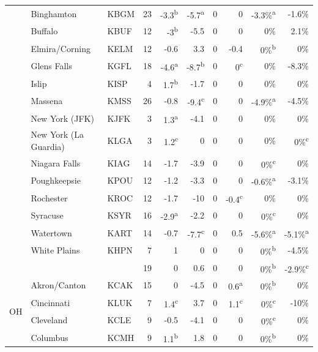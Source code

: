 \documentclass[twocol]{ametsoc}
\begin{document}
\begin{landscape}
\begin{table}[]
\begin{tabular}{@{}cllrrrrrrr@{}}
 & Binghamton & KBGM & 23 & -3.3\textsuperscript{b} & -5.7\textsuperscript{a} & 0 & 0 & -3.3\%\textsuperscript{a} & -1.6\% \\
 & Buffalo & KBUF & 12 & -3\textsuperscript{b} & -5.5 & 0 & 0 & 0\% & 2.1\% \\
 & Elmira/Corning & KELM & 12 & -0.6 & 3.3 & 0 & -0.4 & 0\%\textsuperscript{b} & 0\% \\
 & Glens Falls & KGFL & 18 & -4.6\textsuperscript{a} & -8.7\textsuperscript{b} & 0 & 0\textsuperscript{c} & 0\% & -8.3\% \\
 & Islip & KISP & 4 & 1.7\textsuperscript{b} & -1.7 & 0 & 0 & 0\% & 0\% \\
 & Massena & KMSS & 26 & -0.8 & -9.4\textsuperscript{c} & 0 & 0 & -4.9\%\textsuperscript{a} & -4.5\% \\
 & New York (JFK) & KJFK & 3 & 1.3\textsuperscript{a} & -4.1 & 0 & 0 & 0\% & 0\% \\
 & New York (La Guardia) & KLGA & 3 & 1.2\textsuperscript{c} & 0 & 0 & 0 & 0\% & 0\%\textsuperscript{c} \\
 & Niagara Falls & KIAG & 14 & -1.7 & -3.9 & 0 & 0 & 0\%\textsuperscript{c} & 0\% \\
 & Poughkeepsie & KPOU & 12 & -1.2 & -3.3 & 0 & 0 & -0.6\%\textsuperscript{a} & -3.1\% \\
 & Rochester & KROC & 12 & -1.7 & -10 & 0 & -0.4\textsuperscript{c} & 0\% & 0\% \\
 & Syracuse & KSYR & 16 & -2.9\textsuperscript{a} & -2.2 & 0 & 0 & 0\%\textsuperscript{c} & 0\% \\
 & Watertown & KART & 14 & -0.7 & -7.7\textsuperscript{c} & 0 & 0.5 & -5.6\%\textsuperscript{a} & -5.1\%\textsuperscript{a} \\
 & White Plains & KHPN & 7 & 1 & 0 & 0 & 0 & 0\%\textsuperscript{b} & -4.5\% \\ \cmidrule(l){2-10} 
 &  &  & 19 & 0 & 0.6 & 0 & 0 & 0\%\textsuperscript{b} & -2.9\%\textsuperscript{c} \\ \midrule
\multirow{10}{*}{OH} & Akron/Canton & KCAK & 15 & 0 & -4.5 & 0 & 0.6\textsuperscript{a} & 0\%\textsuperscript{b} & 0\% \\
 & Cincinnati & KLUK & 7 & 1.4\textsuperscript{c} & 3.7 & 0 & 1.1\textsuperscript{c} & 0\%\textsuperscript{c} & -10\% \\
 & Cleveland & KCLE & 9 & -0.5 & -4.1 & 0 & 0 & 0\%\textsuperscript{c} & 0\% \\
 & Columbus & KCMH & 9 & 1.1\textsuperscript{b} & 1.8 & 0 & 0 & 0\%\textsuperscript{b} & 0\% \\

\end{tabular}
\end{table}
\end{landscape}
\end{document}
